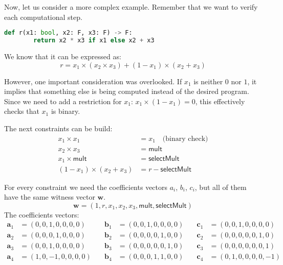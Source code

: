 \documentclass[../lecture-notes.tex]{subfiles}
\begin{document}
\begin{example}
    Now, let us consider a more complex example. Remember that we want to verify each computational step.

    \begin{lstlisting}[language=Python,numbers=none]
    def r(x1: bool, x2: F, x3: F) -> F:
        return x2 * x3 if x1 else x2 + x3
    \end{lstlisting}

    We know that it can be expressed as:
    \[ r = x_1 \times (x_2 \times x_3) + (1 - x_1) \times (x_2 + x_3) \]

    However, one important consideration was overlooked. If $x_1$ is neither $0$ nor $1$, it implies
    that something else is being computed instead of the desired program. Since we need to add a
    restriction for $x_1$: $x_1 \times (1 - x_1) = 0$, this effectively checks that $x_1$ is binary.

    The next constraints can be build:
    \begin{align*}
        x_1 \times x_1 &= x_1 \quad \text{(binary check)} \tag{1} \\
        x_2 \times x_3 &= \mathsf{mult} \tag{2} \\
        x_1 \times \mathsf{mult} &= \mathsf{selectMult} \tag{3} \\
        (1 - x_1) \times (x_2 + x_3) &= r - \mathsf{selectMult} \tag{4}
    \end{align*}

    For every constraint we need the coefficients vectors $a_i$, $b_i$, $c_i$, but all of them have
    the same witness vector $\mathbf{w}$.
    \[ \mathbf{w} = (1, r, x_1, x_2, x_3, \mathsf{mult}, \mathsf{selectMult}) \]
    The coefficients vectors:
    \begin{align*}
        \mathbf{a}_1 &= (0, 0, 1, 0, 0, 0, 0) & \quad \mathbf{b}_1 &= (0, 0, 1, 0, 0, 0, 0) & \quad \mathbf{c}_1 &= (0, 0, 1, 0, 0, 0, 0) \\
        \mathbf{a}_2 &= (0, 0, 0, 1, 0, 0, 0) & \quad \mathbf{b}_2 &= (0, 0, 0, 0, 1, 0, 0) & \quad \mathbf{c}_2 &= (0, 0, 0, 0, 0, 1, 0) \\
        \mathbf{a}_3 &= (0, 0, 1, 0, 0, 0, 0) & \quad \mathbf{b}_3 &= (0, 0, 0, 0, 0, 1, 0) & \quad \mathbf{c}_3 &= (0, 0, 0, 0, 0, 0, 1) \\
        \mathbf{a}_4 &= (1, 0, -1, 0, 0, 0, 0) & \quad \mathbf{b}_4 &= (0, 0, 0, 1, 1, 0, 0) & \quad \mathbf{c}_4 &= (0, 1, 0, 0, 0, 0, -1)
    \end{align*}


\end{example}
\end{document}
